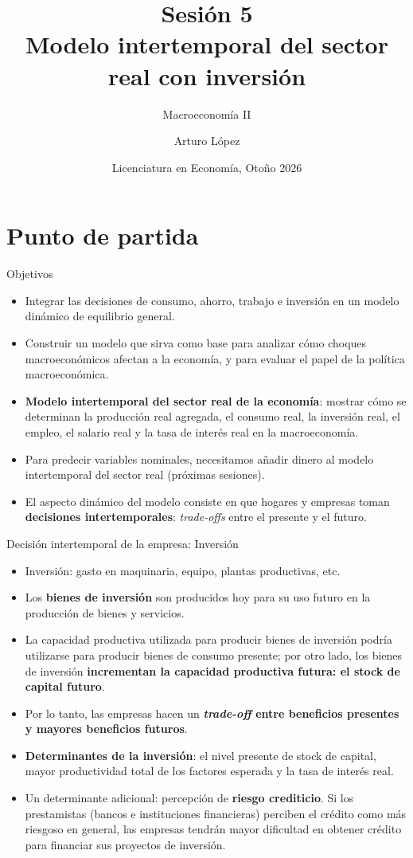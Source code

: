 \documentclass[aspectratio=169,11pt]{beamer}
\title[Macroeconomía II]{Sesión 5 \\ Modelo intertemporal del sector real con inversión}
\subtitle{Macroeconomía II}
\author[LECO]{Arturo López}
\institute[CIDE]{Centro de Investigación y Docencia Económicas (CIDE)}
\date[Otoño 2026]{Licenciatura en Economía, Otoño 2026}
\begin{document}
\begin{frame}
  \titlepage
\end{frame}

\section{Punto de partida}


\begin{frame}{Objetivos}
  \begin{itemize}
    \setlength{\itemsep}{0.55em}
    \item Integrar las decisiones de consumo, ahorro, trabajo e inversión en un modelo dinámico de equilibrio general.
    \item Construir un modelo que sirva como base para analizar cómo choques macroeconómicos afectan a la economía, y para evaluar el papel de la política macroeconómica.
    \item \textbf{Modelo intertemporal del sector real de la economía}: mostrar cómo se determinan la producción real agregada, el consumo real, la inversión real, el empleo, el salario real y la tasa de interés real en la macroeconomía.
    \item Para predecir variables nominales, necesitamos añadir dinero al modelo intertemporal del sector real (próximas sesiones).
    \item El aspecto dinámico del modelo consiste en que hogares y empresas toman \textbf{decisiones intertemporales}: \textit{trade-offs} entre el presente y el futuro.
  \end{itemize}
\end{frame}


\begin{frame}{Decisión intertemporal de la empresa: Inversión}
  \small
  \begin{itemize}
    \item Inversión: gasto en maquinaria, equipo, plantas productivas, etc.
    \item Los \textbf{bienes de inversión} son producidos hoy para su uso futuro en la producción de bienes y servicios.
    \item La capacidad productiva utilizada para producir bienes de inversión podría utilizarse para producir bienes de consumo presente; por otro lado, los bienes de inversión \textbf{incrementan la capacidad productiva futura: el stock de capital futuro}.
    \item Por lo tanto, las empresas hacen un \textbf{\textit{trade-off} entre beneficios presentes y mayores beneficios futuros}.
    \item \textbf{Determinantes de la inversión}: el nivel presente de stock de capital, mayor productividad total de los factores esperada y la tasa de interés real.
    \item Un determinante adicional: percepción de \textbf{riesgo crediticio}. Si los prestamistas (bancos e instituciones financieras) perciben el crédito como más riesgoso en general, las empresas tendrán mayor dificultad en obtener crédito para financiar sus proyectos de inversión.
  \end{itemize}
\end{frame}
\end{document}
